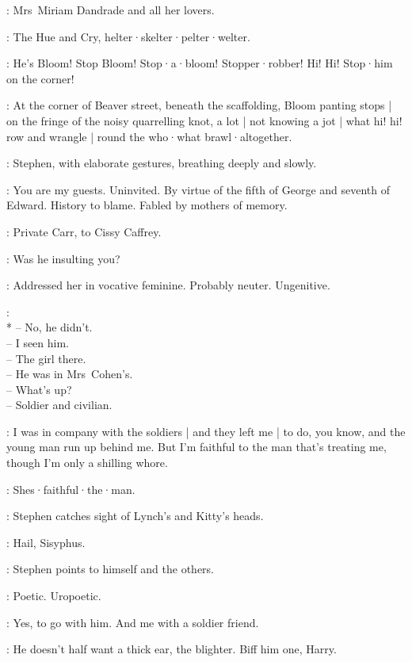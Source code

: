 :
Mrs~Miriam Dandrade and all her lovers.

:
The Hue and Cry,
helter·skelter·pelter·welter.

\HueCry:
He's Bloom!
Stop Bloom!
Stop·a·bloom!
Stopper·robber!
Hi! Hi!
Stop·him on the corner!


:
At the corner of Beaver street,
beneath the scaffolding,
Bloom panting stops |
on the fringe of the noisy quarrelling knot,
a lot |
not knowing a jot |
what hi! hi!
row and wrangle |
round the who·what brawl·altogether.

:
Stephen,
with elaborate gestures,
breathing deeply and slowly.

\Stephen:
You are my guests.
Uninvited.
By virtue of the fifth of George and seventh of Edward.
History to blame.
Fabled by mothers of memory.

:
Private Carr,
to Cissy Caffrey.

\Carr:
Was he insulting you?

\Stephen:
Addressed her in vocative feminine.
Probably neuter.
Ungenitive.

\Voices:\\*
-- No, he didn't.\\
-- I seen him.\\
-- The girl there.\\
-- He was in Mrs~Cohen's.\\
-- What's up?\\
-- Soldier and civilian.

\Cissy[2]:
%
I was in company with the soldiers |
and they left me |
to do,
you know,
and the young man run up behind me.
But I'm faithful to the man that's treating me,
though I'm only a shilling whore.

\Voices:
Shes·faithful·the·man.

:
Stephen catches sight of Lynch's and Kitty's heads.

\Stephen:
Hail,
Sisyphus.

:
Stephen points to himself and the others.

\Stephen:
Poetic.
Uropoetic.

\Cissy:
Yes,
to go with him.
%
And me with a soldier friend.

\Compton[2]:
He doesn't half want a thick ear,
the blighter.
Biff him one,
Harry.


